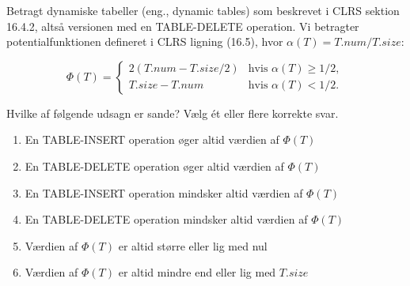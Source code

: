 \documentclass{article}
\theoremstyle{definition}
\begin{document}
\begin{enumerate}
    Betragt dynamiske tabeller (eng., dynamic tables) som beskrevet i CLRS sektion 16.4.2, altså versionen med en TABLE-DELETE operation. Vi betragter potentialfunktionen defineret i CLRS ligning (16.5), hvor $\alpha(T) = T.num/T.size$:

    \[ \Phi(T) = \begin{cases}
    2(T.num - T.size/2) & \text{hvis } \alpha(T) \geq 1/2, \\
    T.size - T.num & \text{hvis } \alpha(T) < 1/2 .
    \end{cases} \]

    Hvilke af følgende udsagn er sande? Vælg ét eller flere korrekte svar.

    \begin{enumerate}
        \item En TABLE-INSERT operation øger altid værdien af $\Phi(T)$
        \item En TABLE-DELETE operation øger altid værdien af $\Phi(T)$
        \item En TABLE-INSERT operation mindsker altid værdien af $\Phi(T)$
        \item En TABLE-DELETE operation mindsker altid værdien af $\Phi(T)$
        \item Værdien af $\Phi(T)$ er altid større eller lig med nul
        \item Værdien af $\Phi(T)$ er altid mindre end eller lig med $T.size$
    \end{enumerate}

\end{enumerate}





\end{document}
